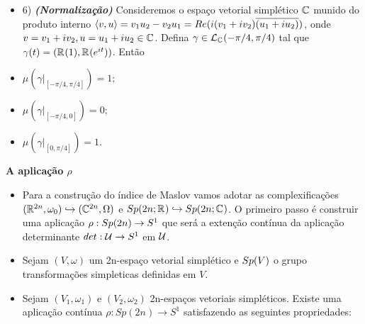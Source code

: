 \documentclass{beamer}
\newcommand{\titulo}[1]{\centering \textbf{#1}}
\begin{document}
\begin{frame}
	\begin{itemize}
		\item 6) \textbf{\textit{(Normalização)}} Consideremos o espaço vetorial simplético $\mathbb{C}^{}$ munido do produto interno $\langle v, u \rangle = v_{1}u_{2}- v_{2}u_{1} = Re(i(v_{1}+iv_{2})\overline{(u_{1}+iu_{2})})$, onde $v=v_{1}+iv_{2},u =u_{1}+iu_{2}\in \mathbb{C}^{}$. Defina $\gamma \in \mathcal{L}_{\mathbb{C}^{}}(-\pi/4,\pi/4)$ tal que $\gamma(t) = (\mathbb{R}^{}(1), \mathbb{R}^{}(e^{it}))$. Então
		\item $\mu(\gamma|_{[-\pi/4, \pi/4]}) = 1;$
		\item $\mu(\gamma|_{[-\pi/4, 0]}) = 0;$
		\item $\mu(\gamma|_{[0, \pi/4]}) = 1.$	
	\end{itemize}
\end{frame}

\begin{frame}
	\titulo{A aplicação $\rho$}
	\begin{itemize}
		\item Para a construção do índice de Maslov vamos adotar as complexificações $(\mathbb{R}^{2n}, \omega_{0}) \hookrightarrow (\mathbb{C}^{2n}, \Omega)$ e $Sp(2n;\mathbb{R}^{}) \hookrightarrow Sp(2n; \mathbb{C}^{})$. O primeiro passo é construir uma aplicação $\rho: Sp(2n)\to S^{1}$ que será a extenção contínua da aplicação determinante $det:\mathcal{U}\to S^{1}$ em $\mathcal{U}$.
		
		\item 
		Sejam $(V, \omega)$ um 2n-espaço vetorial simplético e $Sp(V)$ o grupo transformações simpleticas definidas em $V$.
		
		\item \begin{teorema}\label{teorema_aplicacao_rho}
			Sejam $(V_{1}, \omega_{1})$ e $(V_{2}, \omega_{2})$ 2n-espaços vetoriais simpléticos. Existe uma aplicação contínua $\rho:Sp(2n) \to S^{1}$ satisfazendo as seguintes propriedades:
			
		\end{teorema}
		
	\end{itemize}
\end{frame}
\end{document}
